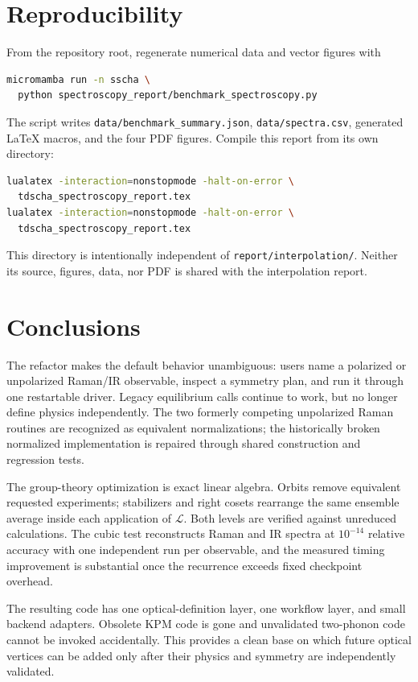 \documentclass[11pt,a4paper]{article}
\begin{document}
\section{Reproducibility}

From the repository root, regenerate numerical data and vector figures with
\begin{lstlisting}[language=bash]
micromamba run -n sscha \
  python spectroscopy_report/benchmark_spectroscopy.py
\end{lstlisting}
The script writes
\texttt{data/benchmark\_summary.json},
\texttt{data/spectra.csv}, generated \LaTeX{} macros, and the four PDF
figures.  Compile this report from its own directory:
\begin{lstlisting}[language=bash]
lualatex -interaction=nonstopmode -halt-on-error \
  tdscha_spectroscopy_report.tex
lualatex -interaction=nonstopmode -halt-on-error \
  tdscha_spectroscopy_report.tex
\end{lstlisting}
This directory is intentionally independent of
\texttt{report/interpolation/}.  Neither its source, figures, data, nor PDF is
shared with the interpolation report.

\section{Conclusions}

The refactor makes the default behavior unambiguous: users name a polarized
or unpolarized Raman/IR observable, inspect a symmetry plan, and run it through
one restartable driver.  Legacy equilibrium calls continue to work, but no
longer define physics independently.  The two formerly competing
unpolarized Raman routines are recognized as equivalent normalizations; the
historically broken normalized implementation is repaired through shared
construction and regression tests.

The group-theory optimization is exact linear algebra.  Orbits remove
equivalent requested experiments; stabilizers and right cosets rearrange the
same ensemble average inside each application of $\mathcal L$.  Both levels
are verified against unreduced calculations.  The cubic test reconstructs
Raman and IR spectra at $10^{-14}$ relative accuracy with one independent run
per observable, and the measured timing improvement is substantial once the
recurrence exceeds fixed checkpoint overhead.

The resulting code has one optical-definition layer, one workflow layer, and
small backend adapters.  Obsolete KPM code is gone and unvalidated two-phonon
code cannot be invoked accidentally.  This provides a clean base on which
future optical vertices can be added only after their physics and symmetry
are independently validated.
\end{document}
